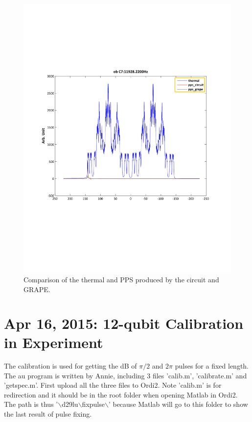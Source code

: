 \documentclass[prl,onecolumn]{revtex4-1}
\newcommand{\dir}{$\backslash$}
\begin{document}
\newpage
\begin{figure}[htb]
\begin{center}
\includegraphics[width=\columnwidth]{thermal_and_pps_circuit_grape.pdf}
\end{center}
\setlength{\abovecaptionskip}{-0.35cm}
\caption{\footnotesize{Comparison of the thermal and PPS produced by the circuit and GRAPE. }}\label{compare_spectra}
\end{figure}

\newpage
\section{Apr 16, 2015: 12-qubit Calibration in Experiment}

The calibration is used for getting the dB of $\pi/2$ and $2\pi$ pulses for a fixed length. The au program is written by Annie, including 3 files 'calib.m', 'calibrate.m' and 'getspec.m'. First upload all the three files to Ordi2. Note 'calib.m' is for redirection and it should be in the root folder when opening Matlab in Ordi2. The path is thus '\dir d29lu\dir fixpulse\dir' because Matlab will go to this folder to show the last result of pulse fixing.
\end{document}
